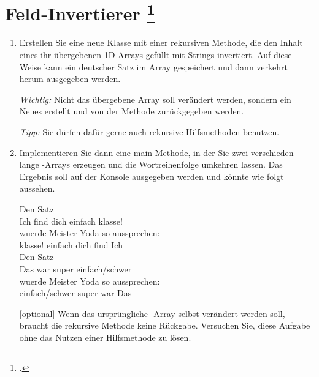 \documentclass{lehramt-informatik-aufgabe}
\begin{document}

\section{Feld-Invertierer
\footcite[Aufgabe 1: Arrays und Rekursion, Diese Aufgabe stammt
aus der Vorlesung Konzepte der Programmierung von Prof. Bernhard
Westfechtel der Universität Bayreuth, WS 2017/18, Übungsblatt 8 und
wurde dankenswerterweise zur Verwendung in diesem Aufgabenblatt zur
Verfügung gestellt.]{aud:ab:2}}

\begin{enumerate}

%

\item Erstellen Sie eine neue Klasse  mit einer
rekursiven Methode, die den Inhalt eines ihr übergebenen 1D-Arrays
gefüllt mit Strings invertiert. Auf diese Weise kann \zB ein deutscher
Satz im Array gespeichert und dann verkehrt herum ausgegeben werden.

\emph{Wichtig:} Nicht das übergebene Array soll verändert werden,
sondern ein Neues erstellt und von der Methode zurückgegeben werden.

\emph{Tipp:} Sie dürfen dafür gerne auch rekursive Hilfsmethoden
benutzen.

%

\item Implementieren Sie dann eine main-Methode, in der Sie zwei
verschieden lange -Arrays erzeugen und die Wortreihenfolge
umkehren lassen. Das Ergebnis soll auf der Konsole ausgegeben werden
und könnte \zB wie folgt aussehen.

\bigskip

{
\ttfamily
Den Satz\\
Ich find dich einfach klasse!\\
wuerde Meister Yoda so aussprechen:\\
klasse! einfach dich find Ich\\

Den Satz\\
Das war super einfach/schwer\\
wuerde Meister Yoda so aussprechen:\\
einfach/schwer super war Das
}

\bigskip

[optional] Wenn das ursprüngliche -Array selbst verändert
werden soll, braucht die rekursive Methode keine Rückgabe. Versuchen
Sie, diese Aufgabe ohne das Nutzen einer Hilfsmethode zu lösen.

\begin{liAntwort}
\end{liAntwort}
\end{enumerate}
\end{document}
